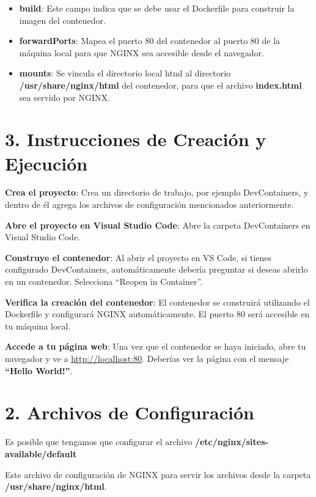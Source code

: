 \documentclass[
  a4paper,
  DIV=11,
  numbers=noendperiod,
  onepage,
  openany]{scrreprt}
\begin{document}
\begin{itemize}
\item
  \textbf{build}: Este campo indica que se debe usar el Dockerfile para
  construir la imagen del contenedor.
\item
  \textbf{forwardPorts}: Mapea el puerto 80 del contenedor al puerto 80
  de la máquina local para que NGINX sea accesible desde el navegador.
\item
  \textbf{mounts}: Se vincula el directorio local html al directorio
  \textbf{/usr/share/nginx/html} del contenedor, para que el archivo
  \textbf{index.html} sea servido por NGINX.
\end{itemize}

\section{3. Instrucciones de Creación y
Ejecución}\label{instrucciones-de-creaciuxf3n-y-ejecuciuxf3n}

\textbf{Crea el proyecto}: Crea un directorio de trabajo, por ejemplo
DevContainers, y dentro de él agrega los archivos de configuración
mencionados anteriormente.

\textbf{Abre el proyecto en Visual Studio Code}: Abre la carpeta
DevContainers en Visual Studio Code.

\textbf{Construye el contenedor}: Al abrir el proyecto en VS Code, si
tienes configurado DevContainers, automáticamente debería preguntar si
deseas abrirlo en un contenedor. Selecciona ``Reopen in Container''.

\textbf{Verifica la creación del contenedor}: El contenedor se
construirá utilizando el Dockerfile y configurará NGINX automáticamente.
El puerto 80 será accesible en tu máquina local.

\textbf{Accede a tu página web}: Una vez que el contenedor se haya
iniciado, abre tu navegador y ve a \url{http://localhost:80}. Deberías
ver la página con el mensaje \textbf{``Hello World!''}.

\section{2. Archivos de
Configuración}\label{archivos-de-configuraciuxf3n}

Es posible que tengamos que configurar el archivo
\textbf{/etc/nginx/sites-available/default}

Este archivo de configuración de NGINX para servir los archivos desde la
carpeta \textbf{/usr/share/nginx/html}.
\end{document}
